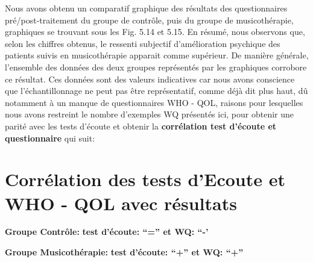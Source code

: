 Nous avons obtenu un comparatif graphique  des résultats des questionnaires
pré/post-traitement du groupe de contrôle, puis du groupe de musicothérapie,
graphiques se trouvant sous les Fig. 5.14 et 5.15.
       En résumé, nous observons que, selon les chiffres obtenus, le ressenti
       subjectif d'amélioration psychique
        des patients suivis en musicothérapie apparait comme
        supérieur.
        De manière générale, l'ensemble des données des deux groupes représentés
        par les graphiques corrobore ce résultat.
        Ces données sont des valeurs indicatives car nous avons conscience que l'échantillonnage ne
        peut pas être représentatif, comme déjà dit plus haut, dû
        notamment à un
        manque de
        questionnaires WHO - QOL, raisons pour lesquelles nous avons
        restreint le nombre d'exemples WQ présentés ici, pour obtenir
        une parité avec les tests d'écoute et obtenir la
        \textbf{corrélation test d'écoute et questionnaire} qui
        suit:

  \section{Corrélation des tests d'Ecoute et WHO - QOL avec résultats }
\textbf{Groupe Contrôle:} 	          \textbf{ test d'écoute: ``=''   et    WQ: ``-'}


\textbf{Groupe Musicothérapie:}     \textbf{test d'écoute: ``+''      et    WQ: ``+''}


